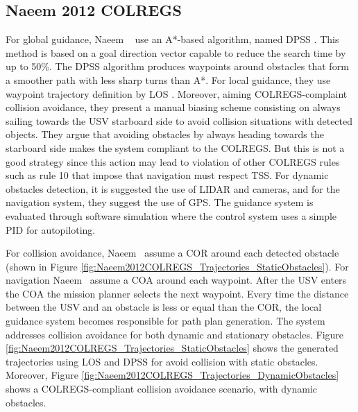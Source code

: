     
    \subsection{Naeem 2012 COLREGS}
    For global guidance, Naeem \etal~\cite{Naeem2012COLREGS} use an A*-based algorithm, named \ac{DPSS} \cite{Yang2010Efficient}. 
    This method is based on a goal direction vector capable to reduce the search time by up to 50\%. The \ac{DPSS} algorithm produces waypoints around obstacles that form a smoother path with less sharp turns than A*. For local guidance, they use waypoint trajectory definition by \ac{LOS} \cite{Healey1993Multivariable}. Moreover, aiming \ac{COLREGS}-complaint collision avoidance, they present a manual biasing scheme consisting on always sailing towards the \ac{USV} starboard side to avoid collision situations with detected objects. They argue that avoiding obstacles by always heading towards the starboard side makes the system compliant to the \ac{COLREGS}. But this is not a good strategy since this action may lead to violation of other \ac{COLREGS} rules such as rule 10 that impose that navigation must respect \acf{TSS}.
    For dynamic obstacles detection, it is suggested the use of \ac{LIDAR} and cameras, and for the navigation system, they suggest the use of \ac{GPS}. The guidance system is evaluated through software simulation where the control system uses a simple \ac{PID} for autopiloting.
        
    For collision avoidance, Naeem \etal~assume a \ac{COR} around each detected obstacle (shown in Figure \ref{fig:Naeem2012COLREGS_Trajectories_StaticObstacles}). For navigation Naeem \etal~assume a \ac{COA} around each waypoint. After the \ac{USV} enters the \ac{COA} the mission planner selects the next waypoint. Every time the distance between the \ac{USV} and an obstacle is less or equal than the \ac{COR}, the local guidance system becomes responsible for path plan generation. The system addresses collision avoidance for both dynamic and stationary obstacles. Figure \ref{fig:Naeem2012COLREGS_Trajectories_StaticObstacles} shows the generated trajectories using \ac{LOS} and \ac{DPSS} for avoid collision with static obstacles. Moreover, Figure \ref{fig:Naeem2012COLREGS_Trajectories_DynamicObstacles} shows a \ac{COLREGS}-compliant collision avoidance scenario, with dynamic obstacles.
    
